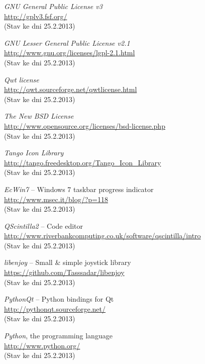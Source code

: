\documentclass[12pt, a4paper, oneside]{article}
\newcommand{\It}{\textit}  %
\begin{document}
\begin{thebibliography}{99}
     \It{GNU General Public License v3} \\
    \url{http://gplv3.fsf.org/}\\
    (Stav ke dni 25.2.2013)

     \It{GNU Lesser General Public License v2.1} \\
    \url{http://www.gnu.org/licenses/lgpl-2.1.html}\\
    (Stav ke dni 25.2.2013)

     \It{Qwt license} \\
    \url{http://qwt.sourceforge.net/qwtlicense.html}\\
    (Stav ke dni 25.2.2013)

     \It{The New BSD License} \\
    \url{http://www.opensource.org/licenses/bsd-license.php}\\
    (Stav ke dni 25.2.2013)

     \It{Tango Icon Library} \\
    \url{http://tango.freedesktop.org/Tango_Icon_Library}\\
    (Stav ke dni 25.2.2013)

     \It{EcWin7} -- Windows 7 taskbar progress indicator \\
    \url{http://www.msec.it/blog/?p=118}\\
    (Stav ke dni 25.2.2013)

     \It{QScintilla2} -- Code editor \\
    \url{http://www.riverbankcomputing.co.uk/software/qscintilla/intro}\\
    (Stav ke dni 25.2.2013)

     \It{libenjoy} -- Small & simple joystick library \\
    \url{https://github.com/Tasssadar/libenjoy}\\
    (Stav ke dni 25.2.2013)

     \It{PythonQt} -- Python bindings for Qt \\
    \url{http://pythonqt.sourceforge.net/}\\
    (Stav ke dni 25.2.2013)

     \It{Python}, the programming language \\
    \url{http://www.python.org/}\\
    (Stav ke dni 25.2.2013)


\end{thebibliography}
\end{document}
